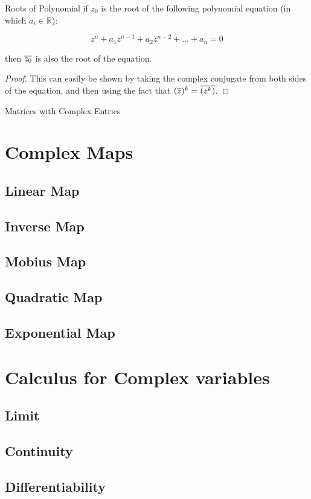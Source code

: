 \begin{propbox}{Roots of Polynomial}
if $z_0$ is the root of the following polynomial equation (in which $a_i \in \mathbb{R}$):

\[ z^n + a_1 z^{n-1} + a_2 z^{n-2} + \ldots + a_n = 0 \]

then $\overline{z_0}$ is also the root of the equation.

\end{propbox}

\begin{proof}
This can easily be shown by taking the complex conjugate from both sides of the equation, and then using the fact that $(\overline{z})^k = \overline{(z^k)}$.

\end{proof}


\begin{example}{Matrices with Complex Entries}

\end{example}



\section{Complex Maps}

\subsection{Linear Map}

\subsection{Inverse Map}

\subsection{Mobius Map}

\subsection{Quadratic Map}

\subsection{Exponential Map}


\section{Calculus for Complex variables}

\subsection{Limit}

\subsection{Continuity}

\subsection{Differentiability}
